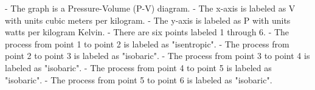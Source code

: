 - The graph is a Pressure-Volume (P-V) diagram.
- The x-axis is labeled as V with units cubic meters per kilogram.
- The y-axis is labeled as P with units watts per kilogram Kelvin.
- There are six points labeled 1 through 6.
- The process from point 1 to point 2 is labeled as "isentropic".
- The process from point 2 to point 3 is labeled as "isobaric".
- The process from point 3 to point 4 is labeled as "isobaric".
- The process from point 4 to point 5 is labeled as "isobaric".
- The process from point 5 to point 6 is labeled as "isobaric".